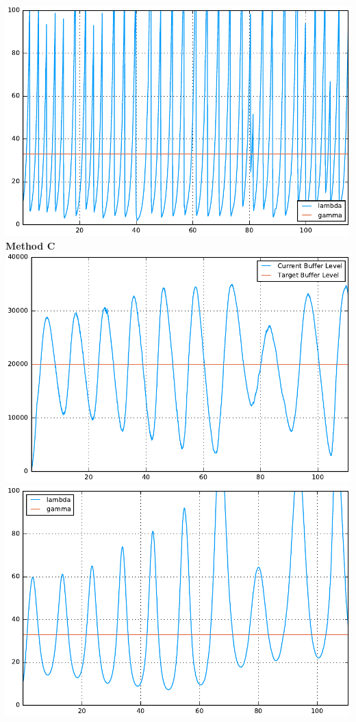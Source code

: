 \documentclass[12pt]{article}
\newenvironment{problem}[2][Problem]{\begin{trivlist}
\item[\hskip \labelsep {\bfseries #1}\hskip \labelsep {\bfseries #2.}]}{\end{trivlist}}
\begin{document}
\begin{problem}{1}
\includegraphics[scale = .5]{stream1.pdf}
\\
\textbf{Method C} \\
\includegraphics[scale = .5]{listen2.pdf}
\includegraphics[scale = .5]{stream2.pdf}

\end{problem}
\end{document}
